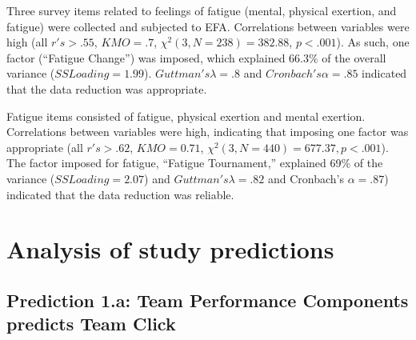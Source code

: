 \begin{CJK}{UTF8}{gbsn}
Three survey items related to feelings of fatigue (mental, physical exertion, and fatigue)  were collected and subjected to EFA.
Correlations between variables were high (all $r's > .55$, $KMO = .7$, $\chi^2(3, N = 238) = 382.88$, $p < .001$).  As such, one factor (``Fatigue Change'') was imposed, which explained 66.3\% of the overall variance ($SS Loading = 1.99$).  $Guttman's \lambda =.8$ and $Cronbach's \alpha = .85$ indicated that the data reduction was appropriate.

Fatigue items consisted of fatigue, physical exertion and mental exertion. Correlations between variables were high, indicating that imposing one factor was appropriate (all $r's > .62$, $KMO = 0.71$, $\chi^2(3, N = 440) =  677.37, p < .001$).  The factor imposed for fatigue, ``Fatigue Tournament,'' explained 69\% of the variance ($SS Loading = 2.07$) and $Guttman's \lambda =.82$ and Cronbach's $\alpha = .87$) indicated that the data reduction was reliable.






























 \section{Analysis of study predictions\label{app8:analysisPredictions}}



 \subsection{Prediction 1.a: Team Performance Components predicts Team Click\label{app8:prediction1a}}





\end{CJK}
